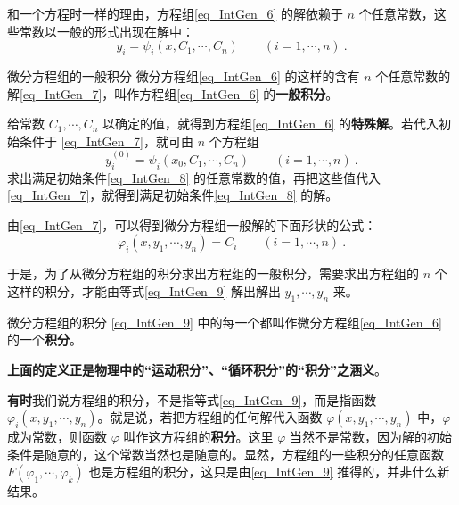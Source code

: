 和一个方程时一样的理由，方程组\autoref{eq_IntGen_6} 的解依赖于 $n$ 个任意常数，这些常数以一般的形式出现在解中：
\begin{equation}\label{eq_IntGen_7}
y_i=\psi_i(x,C_1,\cdots,C_n)\qquad (i=1,\cdots,n)~.
\end{equation}
\begin{definition}{微分方程组的一般积分}
微分方程组\autoref{eq_IntGen_6} 的这样的含有 $n$ 个任意常数的解\autoref{eq_IntGen_7}，叫作方程组\autoref{eq_IntGen_6} 的\textbf{一般积分}。
\end{definition}
给常数 $C_1,\cdots,C_n$ 以确定的值，就得到方程组\autoref{eq_IntGen_6} 的\textbf{特殊解}。若代入初始条件于 \autoref{eq_IntGen_7}，就可由 $n$ 个方程组
\begin{equation}
y_i^{(0)}=\psi_i(x_0,C_1,\cdots,C_n) \qquad (i=1,\cdots,n)~.
\end{equation}
求出满足初始条件\autoref{eq_IntGen_8} 的任意常数的值，再把这些值代入\autoref{eq_IntGen_7}，就得到满足初始条件\autoref{eq_IntGen_8} 的解。

由\autoref{eq_IntGen_7}，可以得到微分方程组一般解的下面形状的公式：
\begin{equation}\label{eq_IntGen_9}
\varphi_i(x,y_1,\cdots,y_n)=C_i\qquad (i=1,\cdots,n)~.
\end{equation}


于是，为了从微分方程组的积分求出方程组的一般积分，需要求出方程组的 $n$ 个这样的积分，才能由等式\autoref{eq_IntGen_9} 解出解出 $y_1,\cdots,y_n$ 来。
\begin{definition}{微分方程组的积分}\label{def_IntGen_1}
\autoref{eq_IntGen_9} 中的每一个都叫作微分方程组\autoref{eq_IntGen_6} 的一个\textbf{积分}。
\end{definition}
\textbf{上面的定义正是物理中的“运动积分”、“循环积分”的“积分”之涵义}。

\textbf{有时}我们说方程组的积分，不是指等式\autoref{eq_IntGen_9}，而是指函数 $\varphi_i(x,y_1,\cdots,y_n)$。就是说，若把方程组的任何解代入函数 $\varphi(x,y_1,\cdots,y_n)$ 中，$\varphi$ 成为常数，则函数 $\varphi$ 叫作这方程组的\textbf{积分}。这里 $\varphi$ 当然不是常数，因为解的初始条件是随意的，这个常数当然也是随意的。显然，方程组的一些积分的任意函数 $F(\varphi_1,\cdots,\varphi_k)$ 也是方程组的积分，这只是由\autoref{eq_IntGen_9} 推得的，并非什么新结果。

